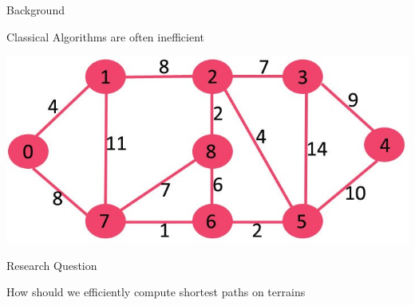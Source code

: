\begin{frame}{Background}
    \begin{center}
        Classical Algorithms are often inefficient
    \end{center}
   \begin{center}
           \includegraphics[scale=.3]{images/algorithm.jpg}
   \end{center}

\end{frame}

\begin{frame}{Research Question}
    \begin{center}
        How should we efficiently compute shortest paths on terrains
    \end{center}
\end{frame}

